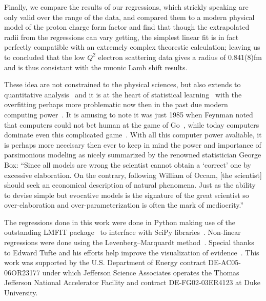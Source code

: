 \documentclass[10pt,aps,prc,twocolumn]{revtex4-1}
\begin{document}
Finally, we compare the results of our regressions, which strickly speaking are only valid over the
range of the data, and compared them to a modern physical model of the proton charge form factor
and find that though the extrapolated radii from the regressions can vary getting, the simplest
linear fit is in fact perfectly compatible with an extremely complex theorestic calculation; leaving
us to concluded that the low $Q^2$ electron scattering data gives a radius of 0.841(8)fm and is thus
consistant with the muonic Lamb shift results.

These idea are not constrained to the physical sciences, but also extends 
to quantitative analysis~\cite{Brighton:2015} and it is at the heart of statistical 
learning~\cite{Hastie:2009} with the overfitting perhaps more problematic now then
in the past due modern computing power~\cite{Cawley:2010}.   It is amusing to note it
was just 1985 when Feynman noted that computers could not bet human at the
game of Go~\cite{Feynman:2008}, while today computers dominate even this complicated game~\cite{Silver:2016,Barradas:2018}.
With all this computer power avaliable, it is perhaps more neccisary then ever
to keep in mind the power and importance of parsimonious modeling as nicely 
summarized by the renowned statistician George Box: 
``Since all models are wrong the scientist cannot obtain a `correct' one
by excessive elaboration.  On the contrary, following William of Occam, 
[the scientist] should seek an economical description of natural phenomena. 
Just as the ability to devise simple but evocative models is the signature of the
great scientist so over-elaboration and over-parameterization is often
the mark of mediocrity.''~\cite{Box76}


\begin{acknowledgments}
The regressions done in this work were done in Python making use of the
outstanding LMFIT package~\cite{Newville:2014} to interface with SciPy
libraries~\cite{Jones:2001}.  Non-linear regressions were done using the
Levenberg–Marquardt method~\cite{Levenberg:1944,Marquardt:1963}.  Special
thanks to Edward Tufte and his efforts help improve the visualization of 
evidence~\cite{Tufte:1986,Tufte:1990,Tufte:1997,Tufte:2006}.
This work was supported by the U.S.  Department of Energy contract DE-AC05-06OR23177
under which Jefferson Science Associates operates the Thomas Jefferson National 
Accelerator Facility and contract DE-FG02-03ER4123 at Duke University.
\end{acknowledgments}
\end{document}
